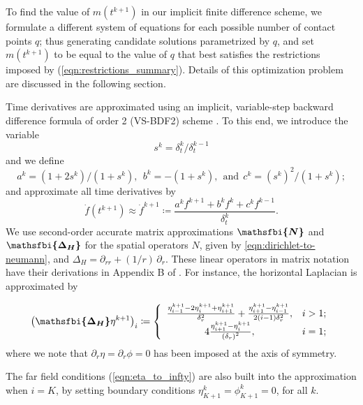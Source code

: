 \documentclass{jfm}
\newcommand{\LapH}[1]{\frac{ #1^{k+1}_{i-1}-2  #1^{k+1}_i+ #1^{k+1}_{i+1}}{\delta_r^2} + 
    \frac{#1^{k+1}_{i+1} - #1^{k+1}_{i-1}}{2 (i-1) \delta_r^2}}
\newcommand{\bfjfm}[1]{\bm{\mathsfbi{#1}}}
\begin{document}
To find the value of $m(t^{k+1})$ in our implicit finite difference scheme, we formulate a different system of equations for each possible number of contact points $q$; thus generating candidate solutions parametrized by $q$, and set $m(t^{k+1})$ to be equal to the value of $q$ that best satisfies the restrictions imposed by (\ref{eqn:restrictions_summary}). Details of this optimization problem are discussed in the following section.

Time derivatives are approximated using an implicit, variable-step backward difference formula of order 2 (VS-BDF2) scheme \citep[see][]{CelayaEtAl2014,Denner2014}. To this end, we introduce the variable
\begin{equation}
s^k = \delta_t^k/\delta_t^{k-1}    
\end{equation}
and we define
\begin{equation}
    a^k = (1 + 2s^k)/(1+s^k), \ \ 
    b^k = -(1 + s^k), \ \ 
    \text{and} \ \ 
    c^k = \left(s^k\right)^2/ (1 + s^k);
\end{equation}
and approximate all time derivatives by
\begin{equation}
\label{eqn:discretised_Laplacian_def}
    \dot{f}(t^{k+1})\approx\dot{f}^{k+1} \coloneqq \frac{a^k f^{k+1}+b^k f^{k}+c^k f^{k-1}}{\delta_t^k}.
\end{equation}
We use second-order accurate matrix approximations $\bfjfm{N}$ and $\bfjfm{\Delta_H}$ for the spatial operators $N$, given by \eqref{eqn:dirichlet-to-neumann}, and $\Delta_H = \partial_{rr} + (1/r)\,\partial_r$. These linear operators in matrix notation have their derivations in Appendix B of \cite{GaleanoRiosEtAl2017}. For instance, the horizontal Laplacian is approximated by

\begin{equation}
    \left(\bfjfm{\Delta_H} \eta^{k+1}\right)_i \coloneqq 
    \left\{
    \begin{array}{cc}
        \LapH{\eta},
        & i>1;
        \\
        4
        \frac{
        \eta_{i+1}^{k+1}
        -\eta_i^{k+1}
        }{
        \left(\delta_{r}\right)^2},
        & i=1;
    \end{array}\right.
\end{equation}
where we note that $\partial_r \eta = \partial_r \phi =0$ has been imposed at the axis of symmetry.

The far field conditions
(\ref{eqn:eta_to_infty}) are also built into  the approximation when $i = K$, by setting boundary conditions $\eta^{k}_{K+1} =\phi^{k}_{K+1} = 0$, for all $k$.
\newcommand{\BDF}[1]{a^k #1^{k+1}+b^k #1^{k}+c^k #1^{k-1}}
\end{document}
